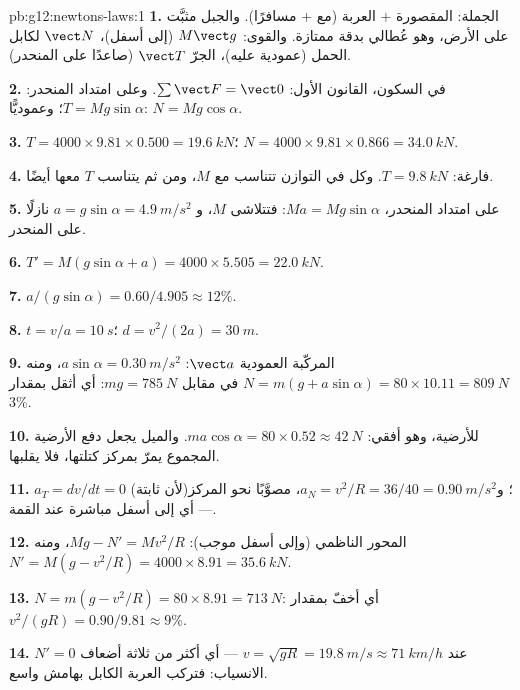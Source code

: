 \begin{solution}{pb:g12:newtons-laws:1}
\textbf{1.} الجملة: المقصورة $+$ العربة (مع $+$ مسافرًا). والجبل
مثبَّت على الأرض، وهو عُطالي بدقة ممتازة. والقوى:
 $M\vect g$ (إلى أسفل)،  $\vect N$ لكابل الحمل
(عمودية عليه)،  الجرّ $\vect T$ (صاعدًا على المنحدر).

\textbf{2.} في السكون، القانون الأول: $\sum \vect F = \vect 0$. وعلى امتداد
المنحدر: $T = Mg\sin\alpha$؛ وعموديًّا: $N = Mg\cos\alpha$.

\textbf{3.} $T = 4000 \times 9.81 \times 0.500 = \qty{19.6}{kN}$؛
$N = 4000 \times 9.81 \times 0.866 = \qty{34.0}{kN}$.

\textbf{4.} فارغة: $T = \qty{9.8}{kN}$. وكل  في التوازن
تتناسب مع $M$، ومن ثم يتناسب $T$ معها أيضًا.

\textbf{5.} على امتداد المنحدر، $Ma = Mg\sin\alpha$: فتتلاشى $M$، و
$a = g\sin\alpha = \qty{4.9}{m/s^2}$ نازلًا على المنحدر.

\textbf{6.} $T' = M(g\sin\alpha + a) = 4000 \times 5.505 =
\qty{22.0}{kN}$.

\textbf{7.} $a/(g\sin\alpha) = 0.60/4.905 \approx 12\%$.

\textbf{8.} $t = v/a = \qty{10}{s}$؛ $d = v^2/(2a) = \qty{30}{m}$.

\textbf{9.} المركّبة العمودية  $\vect a$: $a\sin\alpha =
\qty{0.30}{m/s^2}$، ومنه $N = m(g + a\sin\alpha) = 80 \times 10.11 =
\qty{809}{N}$ في مقابل $mg = \qty{785}{N}$: أي أثقل بمقدار $3\%$.

\textbf{10.}  للأرضية، وهو أفقي:
$ma\cos\alpha = 80 \times 0.52 \approx \qty{42}{N}$. والميل يجعل دفع الأرضية
المجموع يمرّ بمركز كتلتها، فلا يقلبها.

\textbf{11.} $a_T = dv/dt = 0$ (لأن  ثابتة)؛
و$a_N = v^2/R = 36/40 = \qty{0.90}{m/s^2}$، مصوَّبًا نحو المركز ---
أي إلى أسفل مباشرة عند القمة.

\textbf{12.} المحور الناظمي (وإلى أسفل موجب): $Mg - N' = Mv^2/R$، ومنه
$N' = M(g - v^2/R) = 4000 \times 8.91 = \qty{35.6}{kN}$.

\textbf{13.} $N = m(g - v^2/R) = 80 \times 8.91 = \qty{713}{N}$:
أي أخفّ بمقدار $v^2/(gR) = 0.90/9.81 \approx 9\%$.

\textbf{14.} $N' = 0$ عند $v = \sqrt{gR} = \qty{19.8}{m/s} \approx
\qty{71}{km/h}$ --- أي أكثر من ثلاثة أضعاف الانسياب: فتركب العربة
الكابل بهامش واسع.


\end{solution}
